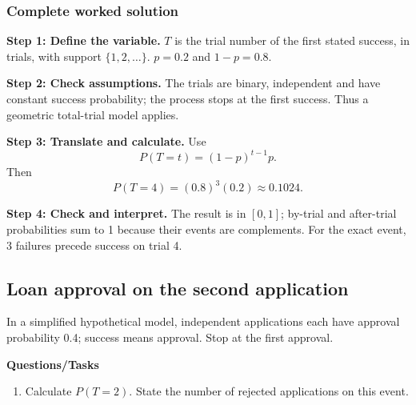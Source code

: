 \subsubsection*{Complete worked solution}
\par\noindent\begin{minipage}{\linewidth}
\textbf{Step 1: Define the variable.} $T$ is the trial number of the first stated success, in trials, with support $\{1,2,\ldots\}$. $p=0.2$ and $1-p=0.8$.
\end{minipage}\par\medskip
\par\noindent\begin{minipage}{\linewidth}
\textbf{Step 2: Check assumptions.} The trials are binary, independent and have constant success probability; the process stops at the first success. Thus a geometric total-trial model applies.
\end{minipage}\par\medskip
\par\noindent\begin{minipage}{\linewidth}
\textbf{Step 3: Translate and calculate.} Use
\[P(T=t)=(1-p)^{t-1}p.\]
Then
\[P(T=4)=(0.8)^{3}(0.2)\approx 0.1024.\]
\end{minipage}\par\medskip
\par\noindent\begin{minipage}{\linewidth}
\textbf{Step 4: Check and interpret.} The result is in $[0,1]$; by-trial and after-trial probabilities sum to 1 because their events are complements. For the exact event, 3 failures precede success on trial 4. 
\end{minipage}\par\medskip
{}
\subsection{Loan approval on the second application}
In a simplified hypothetical model, independent applications each have approval probability 0.4; success means approval. Stop at the first approval.

\textbf{Questions/Tasks}
\begin{enumerate}
\item Calculate $P(T=2)$. State the number of rejected applications on this event.
\end{enumerate}

